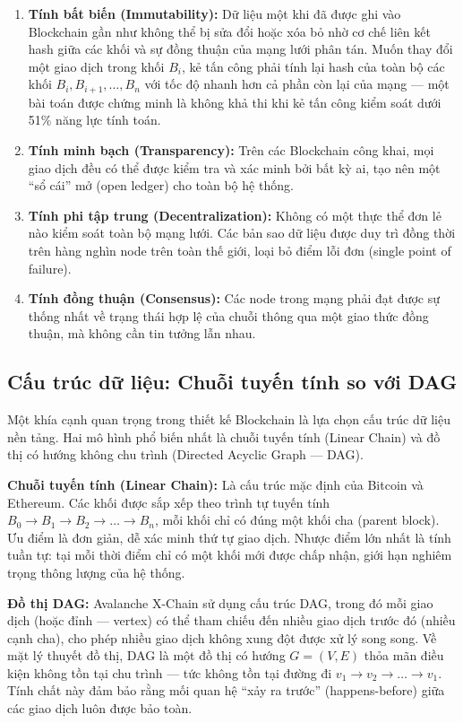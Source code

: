 \begin{enumerate}
    \item \textbf{Tính bất biến (Immutability):} Dữ liệu một khi đã được ghi vào Blockchain gần như không thể bị sửa đổi hoặc xóa bỏ nhờ cơ chế liên kết hash giữa các khối và sự đồng thuận của mạng lưới phân tán. Muốn thay đổi một giao dịch trong khối $B_i$, kẻ tấn công phải tính lại hash của toàn bộ các khối $B_i, B_{i+1}, \ldots, B_n$ với tốc độ nhanh hơn cả phần còn lại của mạng --- một bài toán được chứng minh là không khả thi khi kẻ tấn công kiểm soát dưới 51\% năng lực tính toán.

    \item \textbf{Tính minh bạch (Transparency):} Trên các Blockchain công khai, mọi giao dịch đều có thể được kiểm tra và xác minh bởi bất kỳ ai, tạo nên một ``sổ cái'' mở (open ledger) cho toàn bộ hệ thống.

    \item \textbf{Tính phi tập trung (Decentralization):} Không có một thực thể đơn lẻ nào kiểm soát toàn bộ mạng lưới. Các bản sao dữ liệu được duy trì đồng thời trên hàng nghìn node trên toàn thế giới, loại bỏ điểm lỗi đơn (single point of failure).

    \item \textbf{Tính đồng thuận (Consensus):} Các node trong mạng phải đạt được sự thống nhất về trạng thái hợp lệ của chuỗi thông qua một giao thức đồng thuận, mà không cần tin tưởng lẫn nhau.
\end{enumerate}

\subsection{Cấu trúc dữ liệu: Chuỗi tuyến tính so với DAG}

Một khía cạnh quan trọng trong thiết kế Blockchain là lựa chọn cấu trúc dữ liệu nền tảng. Hai mô hình phổ biến nhất là chuỗi tuyến tính (Linear Chain) và đồ thị có hướng không chu trình (Directed Acyclic Graph --- DAG).

\textbf{Chuỗi tuyến tính (Linear Chain):} Là cấu trúc mặc định của Bitcoin và Ethereum. Các khối được sắp xếp theo trình tự tuyến tính $B_0 \rightarrow B_1 \rightarrow B_2 \rightarrow \ldots \rightarrow B_n$, mỗi khối chỉ có đúng một khối cha (parent block). Ưu điểm là đơn giản, dễ xác minh thứ tự giao dịch. Nhược điểm lớn nhất là tính tuần tự: tại mỗi thời điểm chỉ có một khối mới được chấp nhận, giới hạn nghiêm trọng thông lượng của hệ thống.

\textbf{Đồ thị DAG:} Avalanche X-Chain sử dụng cấu trúc DAG, trong đó mỗi giao dịch (hoặc đỉnh --- vertex) có thể tham chiếu đến nhiều giao dịch trước đó (nhiều cạnh cha), cho phép nhiều giao dịch không xung đột được xử lý song song. Về mặt lý thuyết đồ thị, DAG là một đồ thị có hướng $G = (V, E)$ thỏa mãn điều kiện không tồn tại chu trình --- tức không tồn tại đường đi $v_1 \rightarrow v_2 \rightarrow \ldots \rightarrow v_1$. Tính chất này đảm bảo rằng mối quan hệ ``xảy ra trước'' (happens-before) giữa các giao dịch luôn được bảo toàn.

